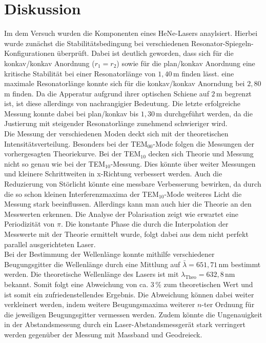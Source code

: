 \section{Diskussion}
Im dem Versuch wurden die Komponenten eines HeNe-Lasers anaylsiert. Hierbei wurde zunächst die
Stabilitätsbedingung bei verschiedenen Resonator-Spiegeln-Konfigurationen überprüft. 
Dabei ist deutlich geworden, dass sich für die konkav/konkav Anordnung ($r_1=r_2$) sowie für
die plan/konkav Anordnung eine kritische Stabilität bei einer Resonatorlänge von $1,40\,$m finden lässt.
eine maximale Resonatorlänge konnte sich für die konkav/konkav Anorndung bei $2,80\,$m finden.
Da die Apperatur aufgrund ihrer optischen Schiene auf $2\,$m begrenzt ist, ist diese allerdings von nachrangigier Bedeutung.
Die letzte erfolgreiche Messung konnte dabei bei plan/konkav bis $1,30\,$m durchgeführt werden, da die Justierung mit
steigender Resonatorlänge zunehmend schwieriger wird.\\
Die Messung der verschiedenen Moden deckt sich mit der theoretischen Intensitätsverteilung.
Besonders bei der TEM$_{00}$-Mode folgen die Messungen der vorhergesagten Theoriekurve. Bei der TEM$_{10}$ decken sich Theorie und Messung 
nicht so genau wie bei der TEM$_{10}$-Messung. Dies könnte über weiter Messungen und kleinere Schrittweiten in x-Richtung verbessert werden.
Auch die Reduzierung von Störlicht könnte eine messbare Verbesserung bewirken, da durch die so schon kleinen Interferenzmaxima der TEM$_{10}$-Mode
weiteres Licht die Messung stark beeinflussen.
Allerdings kann man auch hier die Theorie an den Messwerten erkennen.
Die Analyse der Polarisation zeigt wie erwartet eine Periodizität von $\pi$. Die konstante Phase die
durch die Interpolation der Messwerte mit der Theorie ermittelt wurde, folgt dabei aus dem nicht perfekt
parallel ausgerichteten Laser.\\
Bei der Bestimmung der Wellenlänge konnte mithilfe verschiedener Beugungsgitter die Wellenlänge durch eine Mittlung auf
$\bar{\lambda}=651,71\,$nm bestimmt werden. Die theoretische Wellenlänge des Lasers ist mit $\lambda_{\text{Theo}}=632,8\,$nm bekannt.
Somit folgt eine Abweichung von ca. $3\,$\% zum theoretischen Wert und ist somit ein zufriedenstellendes Ergebnis.
Die Abweichung können dabei weiter verkleinert werden, indem weitere Beugungsmaxima weiterer $n$-ter Ordnung für die jeweiligen Beugungsgitter
vermessen werden. Zudem könnte die Ungenauigkeit in der Abstandsmessung durch ein Laser-Abstandsmessgerät stark verringert werden gegenüber der Messung mit Massband und Geodreieck.
\label{sec:Diskussion}